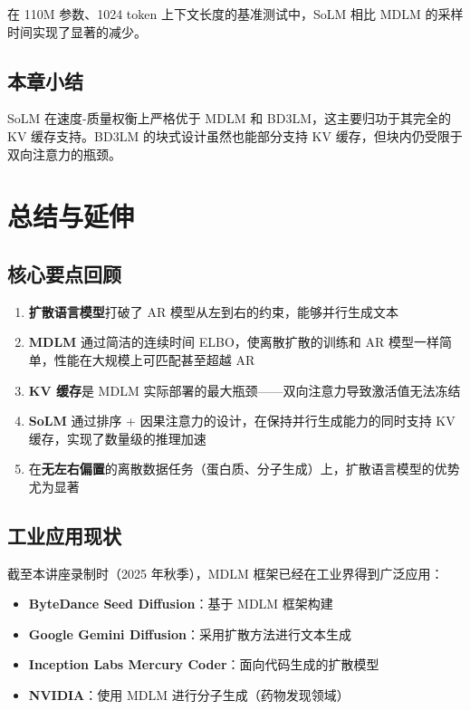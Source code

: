 \documentclass[a4paper]{article}
\begin{document}
在 110M 参数、1024 token 上下文长度的基准测试中，SoLM 相比 MDLM 的采样时间实现了显著的减少。

\subsection{本章小结}

SoLM 在速度-质量权衡上严格优于 MDLM 和 BD3LM，这主要归功于其完全的 KV 缓存支持。BD3LM 的块式设计虽然也能部分支持 KV 缓存，但块内仍受限于双向注意力的瓶颈。

\newpage
\section{总结与延伸}

\subsection{核心要点回顾}

\begin{enumerate}
    \item \textbf{扩散语言模型}打破了 AR 模型从左到右的约束，能够并行生成文本
    \item \textbf{MDLM} 通过简洁的连续时间 ELBO，使离散扩散的训练和 AR 模型一样简单，性能在大规模上可匹配甚至超越 AR
    \item \textbf{KV 缓存}是 MDLM 实际部署的最大瓶颈——双向注意力导致激活值无法冻结
    \item \textbf{SoLM} 通过排序 + 因果注意力的设计，在保持并行生成能力的同时支持 KV 缓存，实现了数量级的推理加速
    \item 在\textbf{无左右偏置}的离散数据任务（蛋白质、分子生成）上，扩散语言模型的优势尤为显著
\end{enumerate}

\subsection{工业应用现状}

截至本讲座录制时（2025 年秋季），MDLM 框架已经在工业界得到广泛应用：

\begin{itemize}
    \item \textbf{ByteDance Seed Diffusion}：基于 MDLM 框架构建
    \item \textbf{Google Gemini Diffusion}：采用扩散方法进行文本生成
    \item \textbf{Inception Labs Mercury Coder}：面向代码生成的扩散模型
    \item \textbf{NVIDIA}：使用 MDLM 进行分子生成（药物发现领域）
\end{itemize}
\end{document}
